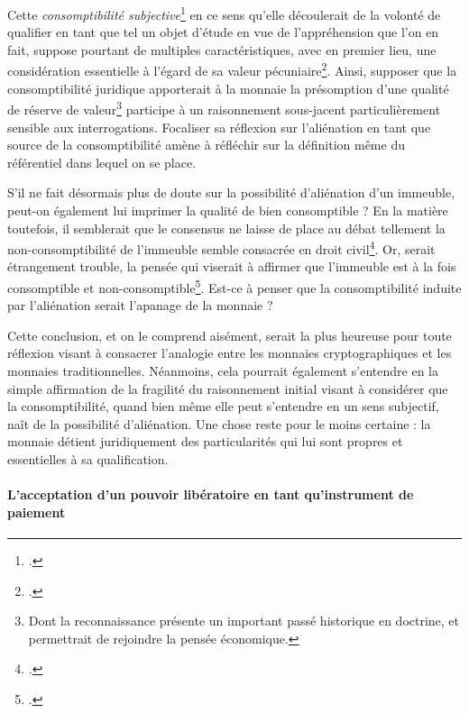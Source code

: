 {Cette \emph{consomptibilité subjective}\footnote{.} en ce sens qu'elle découlerait de la volonté de qualifier en tant que tel un objet d'étude en vue de l'appréhension que l'on en fait, suppose pourtant de multiples caractéristiques, avec en premier lieu, une considération essentielle à l'égard de sa valeur pécuniaire\footnote{.}. Ainsi, supposer que la consomptibilité juridique apporterait à la monnaie la présomption d'une qualité de réserve de valeur\footnote{Dont la reconnaissance présente un important passé historique en doctrine, et permettrait de rejoindre la pensée économique.} participe à un raisonnement sous-jacent particulièrement sensible aux interrogations. Focaliser sa réflexion sur l'aliénation en tant que source de la consomptibilité amène à réfléchir sur la définition même du référentiel dans lequel on se place.\par
 S'il ne fait désormais plus de doute sur la possibilité d'aliénation d'un immeuble, peut-on également lui imprimer la qualité de bien consomptible ? En la matière toutefois, il semblerait que le consensus ne laisse de place au débat tellement la non-consomptibilité de l'immeuble semble consacrée en droit civil\footnote{.}. Or, serait étrangement trouble, la pensée qui viserait à affirmer que l'immeuble est à la fois consomptible et non-consomptible\footnote{.}. Est-ce à penser que la consomptibilité induite par l'aliénation serait l'apanage de la monnaie ?\par
 Cette conclusion, et on le comprend aisément, serait la plus heureuse pour toute réflexion visant à consacrer l'analogie entre les monnaies cryptographiques et les monnaies traditionnelles. Néanmoins, cela pourrait également s'entendre en la simple affirmation de la fragilité du raisonnement initial visant à considérer que la consomptibilité, quand bien même elle peut s'entendre en un sens subjectif, naît de la possibilité d'aliénation. Une chose reste pour le moins certaine : la monnaie détient juridiquement des particularités qui lui sont propres et essentielles à sa qualification.\par

\paragraph{L'acceptation d'un pouvoir libératoire en tant qu'instrument de paiement}

}
